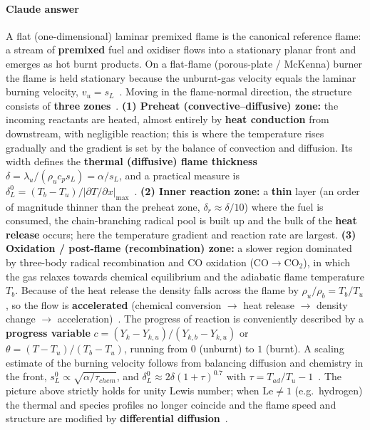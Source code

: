 {\color{istblue}
\paragraph{Claude answer}
A flat (one-dimensional) laminar premixed flame is the canonical reference flame: a stream of \textbf{premixed} fuel and oxidiser flows into a stationary planar front and emerges as hot burnt products. On a flat-flame (porous-plate / McKenna) burner the flame is held stationary because the unburnt-gas velocity equals the laminar burning velocity, $v_u = s_L$~\cite{lecture9,warnatz2006combustion}. Moving in the flame-normal direction, the structure consists of \textbf{three zones}~\cite{warnatz2006combustion,glassman2014combustion,lecture9}. \textbf{(1) Preheat (convective--diffusive) zone:} the incoming reactants are heated, almost entirely by \textbf{heat conduction} from downstream, with negligible reaction; this is where the temperature rises gradually and the gradient is set by the balance of convection and diffusion. Its width defines the \textbf{thermal (diffusive) flame thickness} $\delta = \lambda_u/(\rho_u c_p s_L) = \alpha/s_L$, and a practical measure is $\delta_L^0 = (T_b - T_u)/|\partial T/\partial x|_{\max}$~\cite{lecture9}. \textbf{(2) Inner reaction zone:} a \textbf{thin} layer (an order of magnitude thinner than the preheat zone, $\delta_r \approx \delta/10$) where the fuel is consumed, the chain-branching radical pool is built up and the bulk of the \textbf{heat release} occurs; here the temperature gradient and reaction rate are largest. \textbf{(3) Oxidation / post-flame (recombination) zone:} a slower region dominated by three-body radical recombination and CO oxidation ($\mathrm{CO}\!\rightarrow\!\mathrm{CO_2}$), in which the gas relaxes towards chemical equilibrium and the adiabatic flame temperature $T_b$. Because of the heat release the density falls across the flame by $\rho_u/\rho_b = T_b/T_u$, so the flow is \textbf{accelerated} (chemical conversion $\rightarrow$ heat release $\rightarrow$ density change $\rightarrow$ acceleration)~\cite{lecture9}. The progress of reaction is conveniently described by a \textbf{progress variable} $c = (Y_k - Y_{k,u})/(Y_{k,b}-Y_{k,u})$ or $\theta = (T-T_u)/(T_b-T_u)$, running from $0$ (unburnt) to $1$ (burnt). A scaling estimate of the burning velocity follows from balancing diffusion and chemistry in the front, $s_L^0 \propto \sqrt{\alpha/\tau_{chem}}$, and $\delta_L^0 \approx 2\delta(1+\tau)^{0.7}$ with $\tau = T_{ad}/T_u - 1$~\cite{lecture9}. The picture above strictly holds for unity Lewis number; when $\mathrm{Le}\neq 1$ (e.g.\ hydrogen) the thermal and species profiles no longer coincide and the flame speed and structure are modified by \textbf{differential diffusion}~\cite{warnatz2006combustion,lecture8}.
}





